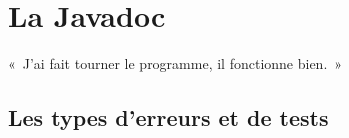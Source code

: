 \chapter{La Javadoc}
\label{chap:javadoc}

\begin{Exergue}
	«~J'ai fait tourner le programme, il fonctionne bien.~»
\end{Exergue}


\minitoc


\section{Les types d'erreurs et de tests}



